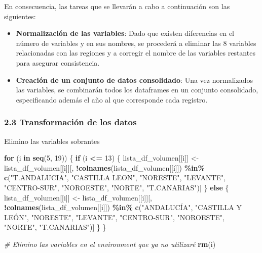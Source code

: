 \documentclass[
]{article}
\newenvironment{Shaded}{\begin{snugshade}}{\end{snugshade}}
\newcommand{\CommentTok}[1]{\textcolor[rgb]{0.56,0.35,0.01}{\textit{#1}}}
\newcommand{\ControlFlowTok}[1]{\textcolor[rgb]{0.13,0.29,0.53}{\textbf{#1}}}
\newcommand{\DecValTok}[1]{\textcolor[rgb]{0.00,0.00,0.81}{#1}}
\newcommand{\FunctionTok}[1]{\textcolor[rgb]{0.13,0.29,0.53}{\textbf{#1}}}
\newcommand{\NormalTok}[1]{#1}
\newcommand{\OtherTok}[1]{\textcolor[rgb]{0.56,0.35,0.01}{#1}}
\newcommand{\SpecialCharTok}[1]{\textcolor[rgb]{0.81,0.36,0.00}{\textbf{#1}}}
\newcommand{\StringTok}[1]{\textcolor[rgb]{0.31,0.60,0.02}{#1}}
\begin{document}
En consecuencia, las tareas que se llevarán a cabo a continuación son
las siguientes:

\begin{itemize}
\item
  \textbf{Normalización de las variables}: Dado que existen diferencias
  en el número de variables y en sus nombres, se procederá a eliminar
  las 8 variables relacionadas con las regiones y a corregir el nombre
  de las variables restantes para asegurar consistencia.
\item
  \textbf{Creación de un conjunto de datos consolidado}: Una vez
  normalizados las variables, se combinarán todos los dataframes en un
  conjunto consolidado, especificando además el año al que corresponde
  cada registro.
\end{itemize}

\hypertarget{transformaciuxf3n-de-los-datos}{%
\subsubsection{2.3 Transformación de los
datos}\label{transformaciuxf3n-de-los-datos}}

Elimino las variables sobrantes

\begin{Shaded}
\begin{Highlighting}[]
\ControlFlowTok{for}\NormalTok{ (i }\ControlFlowTok{in} \FunctionTok{seq}\NormalTok{(}\DecValTok{5}\NormalTok{, }\DecValTok{19}\NormalTok{)) \{}
  \ControlFlowTok{if}\NormalTok{ (i }\SpecialCharTok{\textless{}=} \DecValTok{13}\NormalTok{) \{}
\NormalTok{    lista\_df\_volumen[[i]] }\OtherTok{\textless{}{-}}\NormalTok{ lista\_df\_volumen[[i]][, }\SpecialCharTok{!}\FunctionTok{colnames}\NormalTok{(lista\_df\_volumen[[i]]) }\SpecialCharTok{\%in\%} \FunctionTok{c}\NormalTok{(}\StringTok{"T.ANDALUCIA"}\NormalTok{, }\StringTok{"CASTILLA LEON"}\NormalTok{, }\StringTok{"NORESTE"}\NormalTok{, }\StringTok{"LEVANTE"}\NormalTok{, }\StringTok{"CENTRO{-}SUR"}\NormalTok{, }\StringTok{"NOROESTE"}\NormalTok{, }\StringTok{"NORTE"}\NormalTok{, }\StringTok{"T.CANARIAS"}\NormalTok{)]}
\NormalTok{  \} }
  \ControlFlowTok{else}\NormalTok{ \{}
\NormalTok{    lista\_df\_volumen[[i]] }\OtherTok{\textless{}{-}}\NormalTok{ lista\_df\_volumen[[i]][, }\SpecialCharTok{!}\FunctionTok{colnames}\NormalTok{(lista\_df\_volumen[[i]]) }\SpecialCharTok{\%in\%} \FunctionTok{c}\NormalTok{(}\StringTok{"ANDALUCÍA"}\NormalTok{, }\StringTok{"CASTILLA Y LEÓN"}\NormalTok{, }\StringTok{"NORESTE"}\NormalTok{, }\StringTok{"LEVANTE"}\NormalTok{, }\StringTok{"CENTRO{-}SUR"}\NormalTok{, }\StringTok{"NOROESTE"}\NormalTok{, }\StringTok{"NORTE"}\NormalTok{, }\StringTok{"T.CANARIAS"}\NormalTok{)]}
\NormalTok{  \}}
\NormalTok{\}}

\CommentTok{\# Elimino las variables en el environment que ya no utilizaré}
\FunctionTok{rm}\NormalTok{(i)}
\end{Highlighting}
\end{Shaded}
\end{document}
